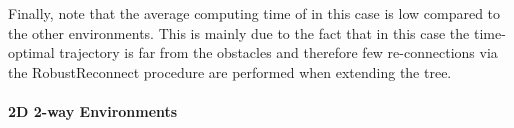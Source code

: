 Finally, note that the average computing time of  in this case is low compared to the other environments. 
This is mainly due to the fact that in this case the time-optimal trajectory is far from the obstacles and therefore few re-connections via the  RobustReconnect procedure are performed when extending the tree.

\paragraph{2D 2-way Environments} 


